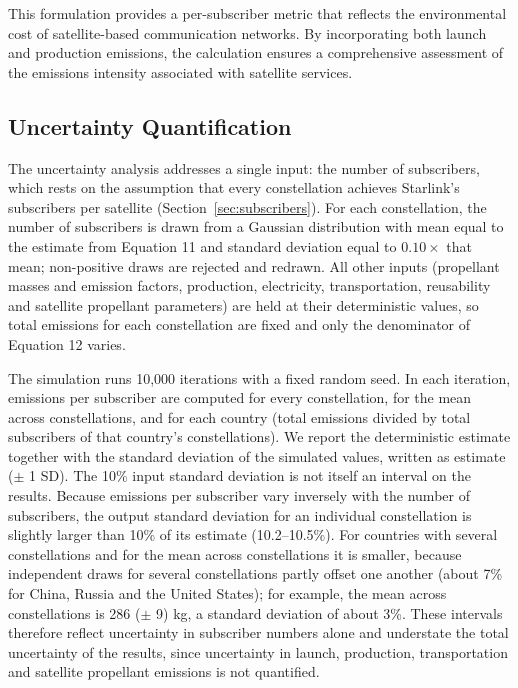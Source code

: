 \documentclass[pdflatex,sn-mathphys-num]{sn-jnl}
\theoremstyle{thmstyleone}%
\theoremstyle{thmstyletwo}%
\theoremstyle{thmstylethree}%
\begin{document}
This formulation provides a per-subscriber metric that reflects the environmental cost of satellite-based communication networks. By incorporating both launch and production emissions, the calculation ensures a comprehensive assessment of the emissions intensity associated with satellite services.

\subsection{Uncertainty Quantification}\label{sec:uncertainty}
The uncertainty analysis addresses a single input: the number of subscribers, which rests on the assumption that every constellation achieves Starlink's subscribers per satellite (Section~\ref{sec:subscribers}). For each constellation, the number of subscribers is drawn from a Gaussian distribution with mean equal to the estimate from Equation 11 and standard deviation equal to \( 0.10 \times \) that mean; non-positive draws are rejected and redrawn. All other inputs (propellant masses and emission factors, production, electricity, transportation, reusability and satellite propellant parameters) are held at their deterministic values, so total emissions for each constellation are fixed and only the denominator of Equation 12 varies.

The simulation runs 10,000 iterations with a fixed random seed. In each iteration, emissions per subscriber are computed for every constellation, for the mean across constellations, and for each country (total emissions divided by total subscribers of that country's constellations). We report the deterministic estimate together with the standard deviation of the simulated values, written as estimate (\( \pm \) 1 SD). The 10\% input standard deviation is not itself an interval on the results. Because emissions per subscriber vary inversely with the number of subscribers, the output standard deviation for an individual constellation is slightly larger than 10\% of its estimate (10.2--10.5\%). For countries with several constellations and for the mean across constellations it is smaller, because independent draws for several constellations partly offset one another (about 7\% for China, Russia and the United States); for example, the mean across constellations is 286 (\( \pm \) 9) kg, a standard deviation of about 3\%. These intervals therefore reflect uncertainty in subscriber numbers alone and understate the total uncertainty of the results, since uncertainty in launch, production, transportation and satellite propellant emissions is not quantified.
\end{document}
